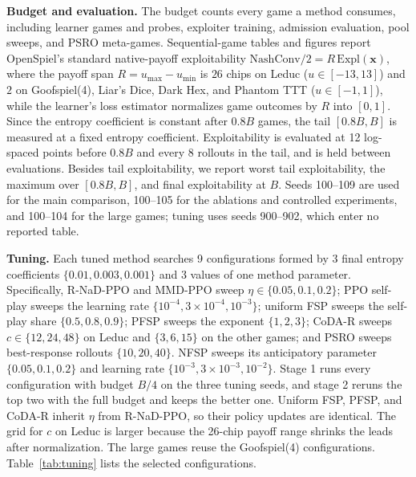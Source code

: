 \documentclass{article} %
\theoremstyle{plain}
\theoremstyle{remark}
\newcommand{\Expl}{\mathrm{Expl}}
\newcommand{\bx}{{\bm{x}}}
\newcommand{\codar}{CoDA-R}
\newcommand{\rnad}{R-NaD-PPO}
\begin{document}
\textbf{Budget and evaluation.} The budget counts every game a method consumes, including learner games and probes, exploiter training, admission evaluation, pool sweeps, and PSRO meta-games. Sequential-game tables and figures report OpenSpiel's standard native-payoff exploitability $\mathrm{NashConv}/2=R\,\Expl(\bx)$, where the payoff span $R=u_{\max}-u_{\min}$ is $26$ chips on Leduc ($u\in[-13,13]$) and $2$ on Goofspiel(4), Liar's Dice, Dark Hex, and Phantom TTT ($u\in[-1,1]$), while the learner's loss estimator normalizes game outcomes by $R$ into $[0,1]$. Since the entropy coefficient is constant after $0.8B$ games, the tail $[0.8B,B]$ is measured at a fixed entropy coefficient. Exploitability is evaluated at 12 log-spaced points before $0.8B$ and every 8 rollouts in the tail, and is held between evaluations. Besides tail exploitability, we report worst tail exploitability, the maximum over $[0.8B,B]$, and final exploitability at $B$. Seeds 100--109 are used for the main comparison, 100--105 for the ablations and controlled experiments, and 100--104 for the large games; tuning uses seeds 900--902, which enter no reported table.

\textbf{Tuning.} Each tuned method searches 9 configurations formed by 3 final entropy coefficients $\{0.01,0.003,0.001\}$ and 3 values of one method parameter. Specifically, \rnad{} and MMD-PPO sweep $\eta\in\{0.05,0.1,0.2\}$; PPO self-play sweeps the learning rate $\{10^{-4},3\times10^{-4},10^{-3}\}$; uniform FSP sweeps the self-play share $\{0.5,0.8,0.9\}$; PFSP sweeps the exponent $\{1,2,3\}$; \codar{} sweeps $c\in\{12,24,48\}$ on Leduc and $\{3,6,15\}$ on the other games; and PSRO sweeps best-response rollouts $\{10,20,40\}$. NFSP sweeps its anticipatory parameter $\{0.05,0.1,0.2\}$ and learning rate $\{10^{-3},3\times10^{-3},10^{-2}\}$. Stage 1 runs every configuration with budget $B/4$ on the three tuning seeds, and stage 2 reruns the top two with the full budget and keeps the better one. Uniform FSP, PFSP, and \codar{} inherit $\eta$ from \rnad{}, so their policy updates are identical. The grid for $c$ on Leduc is larger because the 26-chip payoff range shrinks the leads after normalization. The large games reuse the Goofspiel(4) configurations. Table~\ref{tab:tuning} lists the selected configurations.
\end{document}
